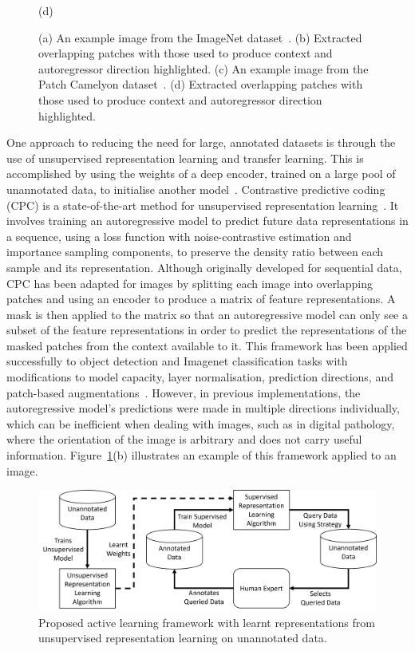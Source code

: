 \begin{figure}
\begin{minipage}[b]{.4\linewidth}
		\centerline{(d)}\medskip
	\end{minipage}
	\caption{(a) An example image from the ImageNet dataset~\citep{deng2009imagenet}. (b) Extracted overlapping patches with those used to produce context and autoregressor direction highlighted. (c) An example image from the Patch Camelyon dataset~\citep{veeling2018rotation}. (d) Extracted overlapping patches with those used to produce context and autoregressor direction highlighted.}
	\label{fig:example_cpc_patches}
\end{figure}

One approach to reducing the need for large, annotated datasets is through the use of unsupervised representation learning and transfer learning. This is accomplished by using the weights of a deep encoder, trained on a large pool of unannotated data, to initialise another model~\citep{weiss2016survey}. Contrastive predictive coding (CPC) is a state-of-the-art method for unsupervised representation learning~\citep{oord2018representation}. It involves training an autoregressive model to predict future data representations in a sequence, using a loss function with noise-contrastive estimation and importance sampling components, to preserve the density ratio between each sample and its representation. Although originally developed for sequential data, CPC has been adapted for images by splitting each image into overlapping patches and using an encoder to produce a matrix of feature representations. A mask is then applied to the matrix so that an autoregressive model can only see a subset of the feature representations in order to predict the representations of the masked patches from the context available to it. This framework has been applied successfully to object detection and Imagenet classification tasks with modifications to model capacity, layer normalisation, prediction directions, and patch-based augmentations~\citep{henaff2020data}. However, in previous implementations, the autoregressive model’s predictions were made in multiple directions individually, which can be inefficient when dealing with images, such as in digital pathology, where the orientation of the image is arbitrary and does not carry useful information. Figure~\ref{fig:example_cpc_patches}(b) illustrates an example of this framework applied to an image.

\begin{figure}[b]
	\centering
	\includegraphics[width=\textwidth]{images/active_unsupervised_learning.png}
	\caption{Proposed active learning framework with learnt representations from unsupervised representation learning on unannotated data.}
	\label{fig:active_unsupervised_learning_framework}
\end{figure}

